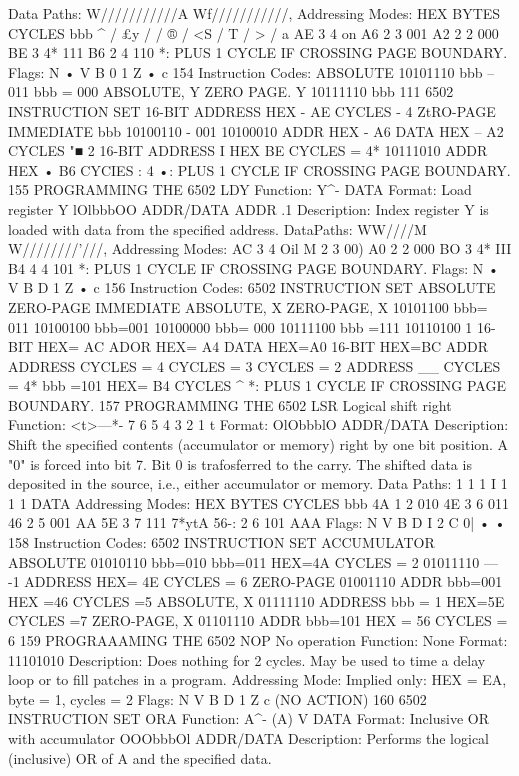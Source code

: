 \documentclass{book}
\begin{document}
Data Paths:
W///////////A Wf///////////,
Addressing Modes:
HEX
BYTES
CYCLES
bbb
^ / £y / / ® / <S / T / > / a
AE
3
4
on
A6
2
3
001
A2
2
2
000
BE
3
4*
111
B6
2
4
110
*: PLUS 1 CYCLE IF CROSSING PAGE BOUNDARY.
Flags:
N
•
V B 0 1 Z
•
c
154
Instruction Codes:
ABSOLUTE 10101110
bbb -- 011
bbb = 000
ABSOLUTE, Y
ZERO PAGE. Y
10111110
bbb 111
6502 INSTRUCTION SET
16-BIT ADDRESS
HEX - AE CYCLES - 4
ZtRO-PAGE
IMMEDIATE
bbb
10100110
- 001
10100010
ADDR
HEX - A6
DATA
HEX -- A2 CYCLES "■ 2
16-BIT ADDRESS
I
HEX BE CYCLES = 4*
10111010 ADDR
HEX • B6 CYCIES : 4
•: PLUS 1 CYCLE IF CROSSING PAGE BOUNDARY.
155
PROGRAMMING THE 6502
LDY
Function:
Y^- DATA
Format:
Load register Y
lOlbbbOO ADDR/DATA ADDR
.1
Description:
Index register Y is loaded with data from the specified address.
DataPaths:
WW////M W////////'///,
Addressing Modes:
AC
3
4
Oil
M
2
3
00)
A0
2
2
000
BO
3
4*
III
B4
4
4
101
*: PLUS 1 CYCLE IF CROSSING PAGE BOUNDARY.
Flags:
N
•
V B D 1 Z
•
c
156
Instruction Codes:
6502 INSTRUCTION SET
ABSOLUTE
ZERO-PAGE
IMMEDIATE
ABSOLUTE, X
ZERO-PAGE, X
10101100
bbb= 011
10100100
bbb=001
10100000
bbb= 000
10111100
bbb =111
10110100
1
16-BIT
HEX= AC
ADOR
HEX= A4
DATA
HEX=A0
16-BIT
HEX=BC
ADDR
ADDRESS
CYCLES = 4
CYCLES = 3
CYCLES = 2
ADDRESS
__
CYCLES = 4*
bbb =101 HEX= B4 CYCLES ^
*: PLUS 1 CYCLE IF CROSSING PAGE BOUNDARY.
157
PROGRAMMING THE 6502
LSR Logical shift right
Function: <t>—*- 7 6 5 4 3 2 1 t
Format: OlObbblO ADDR/DATA
Description:
Shift the specified contents (accumulator or memory) right by
one bit position. A "0" is forced into bit 7. Bit 0 is trafosferred to
the carry. The shifted data is deposited in the source, i.e., either
accumulator or memory.
Data Paths:
1
1
1
I
1
1
1
DATA
Addressing Modes:
HEX
BYTES
CYCLES
bbb
4A
1
2
010
4E
3
6
011
46
2
5
001
AA
5E
3
7
111
7*ytA
56-:
2
6
101
AAA
Flags:
N V B D I 2 C
0| • •
158
Instruction Codes:
6502 INSTRUCTION SET
ACCUMULATOR
ABSOLUTE
01010110
bbb=010
bbb=011
HEX=4A CYCLES = 2
01011110
— -1
ADDRESS
HEX= 4E CYCLES = 6
ZERO-PAGE 01001110 ADDR
bbb=001 HEX =46 CYCLES =5
ABSOLUTE, X 01111110 ADDRESS
bbb = 1 HEX=5E CYCLES =7
ZERO-PAGE, X 01101110 ADDR
bbb=101 HEX = 56 CYCLES = 6
159
PROGRAAAMING THE 6502
NOP No operation
Function:
None
Format: 11101010
Description:
Does nothing for 2 cycles. May be used to time a delay loop or to
fill patches in a program.
Addressing Mode:
Implied only:
HEX = EA, byte = 1, cycles = 2
Flags:
N V B D 1 Z c
(NO ACTION)
160
6502 INSTRUCTION SET
ORA
Function:
A^- (A) V DATA
Format:
Inclusive OR with accumulator
OOObbbOl ADDR/DATA
Description:
Performs the logical (inclusive) OR of A and the specified data.
\end{document}

